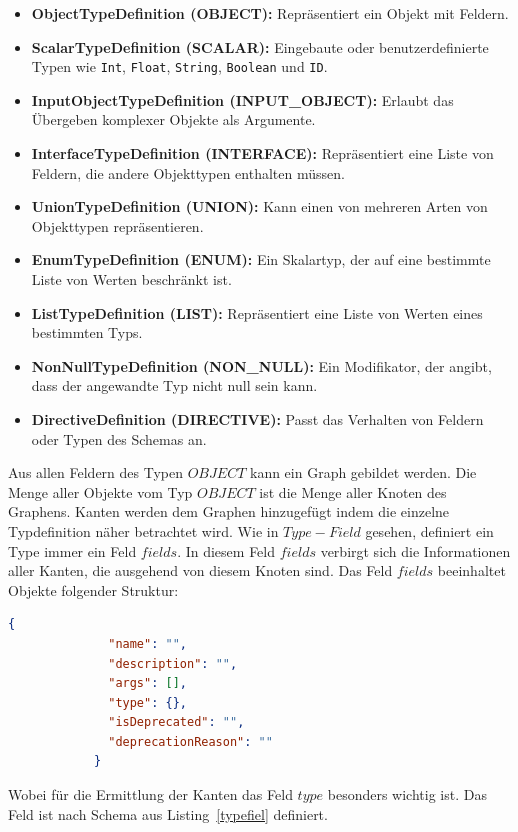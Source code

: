 \begin{itemize}
    \item \textbf{ObjectTypeDefinition (OBJECT):} Repräsentiert ein Objekt mit Feldern.
    \item \textbf{ScalarTypeDefinition (SCALAR):} Eingebaute oder benutzerdefinierte Typen wie \texttt{Int}, \texttt{Float}, \texttt{String}, \texttt{Boolean} und \texttt{ID}.
    \item \textbf{InputObjectTypeDefinition (INPUT\_OBJECT):} Erlaubt das Übergeben komplexer Objekte als Argumente.
    \item \textbf{InterfaceTypeDefinition (INTERFACE):} Repräsentiert eine Liste von Feldern, die andere Objekttypen enthalten müssen.
    \item \textbf{UnionTypeDefinition (UNION):} Kann einen von mehreren Arten von Objekttypen repräsentieren.
    \item \textbf{EnumTypeDefinition (ENUM):} Ein Skalartyp, der auf eine bestimmte Liste von Werten beschränkt ist.
    \item \textbf{ListTypeDefinition (LIST):} Repräsentiert eine Liste von Werten eines bestimmten Typs.
    \item \textbf{NonNullTypeDefinition (NON\_NULL):} Ein Modifikator, der angibt, dass der angewandte Typ nicht null sein kann.
    \item \textbf{DirectiveDefinition (DIRECTIVE):} Passt das Verhalten von Feldern oder Typen des Schemas an.
\end{itemize}

Aus allen Feldern des Typen $OBJECT$ kann ein Graph gebildet werden.
Die Menge aller Objekte vom Typ $OBJECT$ ist die Menge aller Knoten des Graphens.
Kanten werden dem Graphen hinzugefügt indem die einzelne Typdefinition näher betrachtet wird.
Wie in $Type-Field$ gesehen, definiert ein Type immer ein Feld $fields$.
In diesem Feld $fields$ verbirgt sich die Informationen aller Kanten, die ausgehend von diesem Knoten sind.
Das Feld $fields$ beeinhaltet Objekte folgender Struktur:

\begin{lstlisting}[language=json, caption={Type-Field},captionpos=b]
            {
              "name": "",
              "description": "",
              "args": [],
              "type": {},
              "isDeprecated": "",
              "deprecationReason": ""
            }
\end{lstlisting}

Wobei für die Ermittlung der Kanten das Feld $type$ besonders wichtig ist.
Das Feld ist nach Schema aus Listing~\ref{typefiel} definiert.


